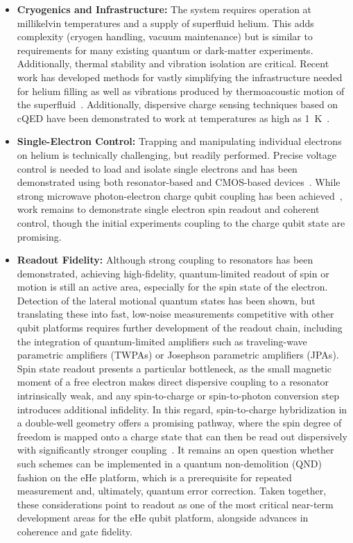 \documentclass[fleqn,10pt]{wlscirep}
\begin{document}
\begin{itemize}
\item {\bf Cryogenics and Infrastructure:} The system requires operation at millikelvin temperatures and a supply of superfluid helium.  This adds complexity (cryogen handling, vacuum maintenance) but is similar to requirements for many existing quantum or dark-matter experiments. Additionally, thermal stability and vibration isolation are critical. Recent work has developed methods for vastly simplifying the infrastructure needed for helium filling as well as vibrations produced by thermoacoustic motion of the superfluid~\cite{castoria2024hermetic}. Additionally, dispersive charge sensing techniques based on cQED have been demonstrated to work at temperatures as high as 1~K~\cite{castoria2025}.
\item {\bf Single-Electron Control:} Trapping and manipulating individual electrons on helium is technically challenging, but readily performed.  Precise voltage control is needed to load and isolate single electrons and has been demonstrated using both resonator-based and CMOS-based devices~\cite{castoria2025,castoria2025selective}. While strong microwave photon-electron charge qubit coupling has been achieved~\cite{koolstra2026strong}, work remains to demonstrate single electron spin readout and coherent control, though the initial experiments coupling to the charge qubit state are promising.
\item {\bf Readout Fidelity:} Although strong coupling to resonators has been demonstrated, achieving high-fidelity, quantum-limited readout of spin or motion is still an active area, especially for the spin state of the electron.  Detection of the lateral motional quantum states has been shown, but translating these into fast, low-noise measurements competitive with other qubit platforms requires further development of the readout chain, including the integration of quantum-limited amplifiers such as traveling-wave parametric amplifiers (TWPAs) or Josephson parametric amplifiers (JPAs). Spin state readout presents a particular bottleneck, as the small magnetic moment of a free electron makes direct dispersive coupling to a resonator intrinsically weak, and any spin-to-charge or spin-to-photon conversion step introduces additional infidelity. In this regard, spin-to-charge hybridization in a double-well geometry offers a promising pathway, where the spin degree of freedom is mapped onto a charge state that can then be read out dispersively with significantly stronger coupling~\cite{burkard2023semiconductor}. It remains an open question whether such schemes can be implemented in a quantum non-demolition (QND) fashion on the eHe platform, which is a prerequisite for repeated measurement and, ultimately, quantum error correction. Taken together, these considerations point to readout as one of the most critical near-term development areas for the eHe qubit platform, alongside advances in coherence and gate fidelity.

\end{itemize}
\end{document}
